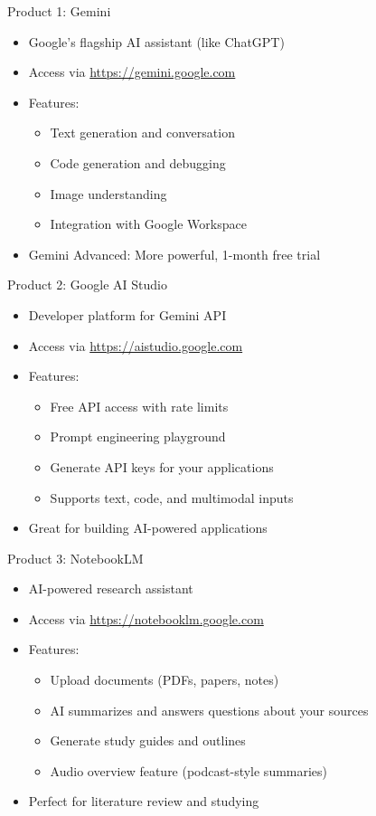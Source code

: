 \documentclass{beamer}
\begin{document}
\begin{frame}{Product 1: Gemini}
\begin{itemize}
    \item Google's flagship AI assistant (like ChatGPT)
    \item Access via \url{https://gemini.google.com}
    \item Features:
    \begin{itemize}
        \item Text generation and conversation
        \item Code generation and debugging
        \item Image understanding
        \item Integration with Google Workspace
    \end{itemize}
    \item Gemini Advanced: More powerful, 1-month free trial
\end{itemize}
\end{frame}

\begin{frame}{Product 2: Google AI Studio}
\begin{itemize}
    \item Developer platform for Gemini API
    \item Access via \url{https://aistudio.google.com}
    \item Features:
    \begin{itemize}
        \item Free API access with rate limits
        \item Prompt engineering playground
        \item Generate API keys for your applications
        \item Supports text, code, and multimodal inputs
    \end{itemize}
    \item Great for building AI-powered applications
\end{itemize}
\end{frame}

\begin{frame}{Product 3: NotebookLM}
\begin{itemize}
    \item AI-powered research assistant
    \item Access via \url{https://notebooklm.google.com}
    \item Features:
    \begin{itemize}
        \item Upload documents (PDFs, papers, notes)
        \item AI summarizes and answers questions about your sources
        \item Generate study guides and outlines
        \item Audio overview feature (podcast-style summaries)
    \end{itemize}
    \item Perfect for literature review and studying
\end{itemize}
\end{frame}
\end{document}
